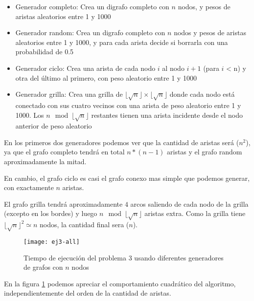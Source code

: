 \begin{itemize}

    \item Generador completo: Crea un digrafo completo con $n$ nodos, y pesos de aristas aleatorios entre 1 y 1000

    \item Generador random: Crea un digrafo completo con $n$ nodos y pesos de aristas aleatorios entre 1 y 1000, y para cada arista decide si borrarla con una probabilidad de 0.5

    \item Generador ciclo: Crea una arista de cada nodo $i$ al nodo $i+1$ (para $i$ < n) y otra del último al primero, con peso aleatorio entre 1 y 1000

    \item Generador grilla: Crea una grilla de $\lfloor \sqrt{n} \rfloor \times \lfloor \sqrt{n} \rfloor$ donde cada nodo está conectado con sus cuatro vecinos con una arista de peso aleatorio entre 1 y 1000. Los $n \mod \lfloor \sqrt{n} \rfloor$ restantes tienen una arista incidente desde el nodo anterior de peso aleatorio

\end{itemize}

En los primeros dos generadores podemos ver que la cantidad de aristas será \bigo($n^2$), ya que el grafo completo tendrá en total $n * (n-1)$ aristas y el grafo random aproximadamente la mitad.

En cambio, el grafo ciclo es casi el grafo conexo mas simple que podemos generar, con exactamente $n$ aristas.

El grafo grilla tendrá aproximadamente $4$ arcos saliendo de cada nodo de la grilla (excepto en los bordes) y luego $n \mod \lfloor \sqrt{n} \rfloor$ aristas extra. Como la grilla tiene $\lfloor \sqrt{n} \rfloor^2 \simeq n$ nodos, la cantidad final sera \bigo($n$).

    \begin{figure}[H]
    	\centering
    	\texttt{[image: ej3-all]}
    	\caption{Tiempo de ejecución del problema 3 usando diferentes generadores de grafos con $n$ nodos}
    	\label{fig:ej3-all}
    \end{figure}

En la figura \ref{fig:ej3-all} podemos apreciar el comportamiento cuadrático del algoritmo, independientemente del orden de la cantidad de aristas.


